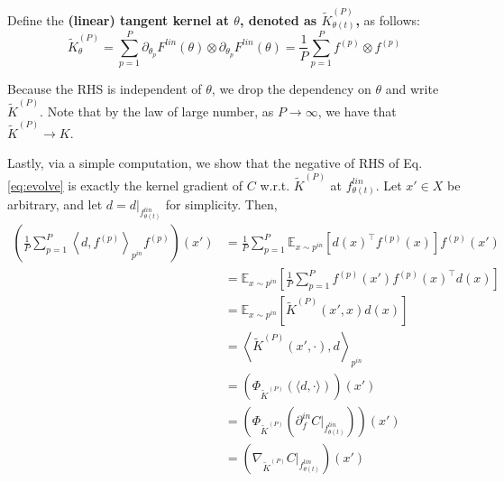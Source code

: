 \documentclass{article}
\theoremstyle{plain}
\theoremstyle{definition}
\theoremstyle{remark}
\begin{document}
Define the {\bf (linear) tangent kernel at $\theta$, denoted as $\tilde{K}^{(P)}_{\theta(t)}$,} as follows:
\begin{equation}
	\tilde{K}^{(P)}_{\theta} = \sum_{p=1}^P \partial_{\theta_p} F^{lin}(\theta) \otimes \partial_{\theta_p} F^{lin}(\theta)
	= \frac{1}{P} \sum_{p=1}^P f^{(p)} \otimes f^{(p)}
\end{equation}

Because the RHS is independent of $\theta$, we drop the dependency on $\theta$ and write $\tilde{K}^{(P)}$.
Note that by the law of large number, as $P \rightarrow \infty$, we have that $\tilde{K}^{(P)} \rightarrow K$.

Lastly, via a simple computation, we show that the negative of RHS of Eq. \ref{eq:evolve} is exactly the kernel gradient of $C$ w.r.t. $\tilde{K}^{(P)}$ at $f_{\theta(t)}^{lin}$.
Let $x' \in X$ be arbitrary, and let $d = d\rvert_{f_{\theta(t)}^{lin}}$ for simplicity.
Then,
\begin{align*}
	\left( \frac{1}{P} \sum_{p=1}^P \left\langle d, f^{(p)} \right\rangle_{p^{in}} f^{(p)} \right)(x') &= \frac{1}{P} \sum_{p=1}^P \mathbb{E}_{x \sim p^{in}} [d(x)^\intercal f^{(p)}(x)] f^{(p)}(x') \\
	&= \mathbb{E}_{x \sim p^{in}} \left[\frac{1}{P} \sum_{p=1}^P f^{(p)}(x') f^{(p)}(x)^\intercal d(x) \right] \\
	&= \mathbb{E}_{x \sim p^{in}} \left[\tilde{K}^{(P)}(x', x) d(x) \right] \\
	&= \left\langle \tilde{K}^{(P)}(x', \cdot), d \right\rangle_{p^{in}} \\
	&= \left( \Phi_{\tilde{K}^{(P)}} \left( \langle d, \cdot \rangle \right) \right)(x') \\
	&= \left( \Phi_{\tilde{K}^{(P)}} \left( \partial_f^{in} C \rvert_{f_{\theta(t)}^{lin}} \right) \right)(x') \\
	&= \left( \nabla_{\tilde{K}^{(P)}} C \rvert_{f_{\theta(t)}^{lin}} \right)(x')
\end{align*}
\end{document}
